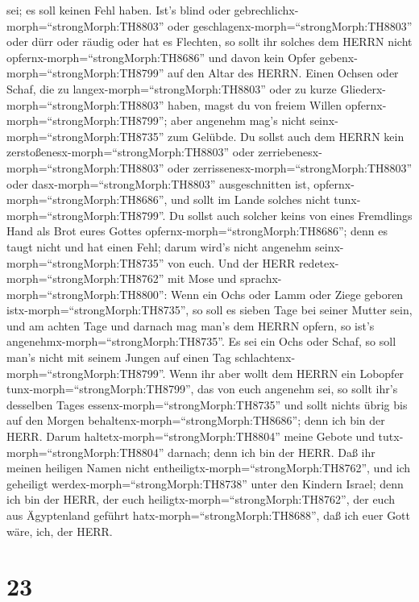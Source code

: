 sei; es soll keinen Fehl haben.  Ist's blind oder
gebrechlichx-morph=``strongMorph:TH8803'' oder
geschlagenx-morph=``strongMorph:TH8803'' oder dürr oder räudig oder hat
es Flechten, so sollt ihr solches dem HERRN nicht
opfernx-morph=``strongMorph:TH8686'' und davon kein Opfer
gebenx-morph=``strongMorph:TH8799'' auf den Altar des HERRN.
 Einen Ochsen oder Schaf, die zu
langex-morph=``strongMorph:TH8803'' oder zu kurze
Gliederx-morph=``strongMorph:TH8803'' haben, magst du von freiem Willen
opfernx-morph=``strongMorph:TH8799''; aber angenehm mag's nicht
seinx-morph=``strongMorph:TH8735'' zum Gelübde.  Du sollst
auch dem HERRN kein zerstoßenesx-morph=``strongMorph:TH8803'' oder
zerriebenesx-morph=``strongMorph:TH8803'' oder
zerrissenesx-morph=``strongMorph:TH8803'' oder
dasx-morph=``strongMorph:TH8803'' ausgeschnitten ist,
opfernx-morph=``strongMorph:TH8686'', und sollt im Lande solches nicht
tunx-morph=``strongMorph:TH8799''.  Du sollst auch solcher
keins von eines Fremdlings Hand als Brot eures Gottes
opfernx-morph=``strongMorph:TH8686''; denn es taugt nicht und hat einen
Fehl; darum wird's nicht angenehm seinx-morph=``strongMorph:TH8735'' von
euch.  Und der HERR redetex-morph=``strongMorph:TH8762''
mit Mose und sprachx-morph=``strongMorph:TH8800'':  Wenn
ein Ochs oder Lamm oder Ziege geboren istx-morph=``strongMorph:TH8735'',
so soll es sieben Tage bei seiner Mutter sein, und am achten Tage und
darnach mag man's dem HERRN opfern, so ist's
angenehmx-morph=``strongMorph:TH8735''.  Es sei ein Ochs
oder Schaf, so soll man's nicht mit seinem Jungen auf einen Tag
schlachtenx-morph=``strongMorph:TH8799''.  Wenn ihr aber
wollt dem HERRN ein Lobopfer tunx-morph=``strongMorph:TH8799'', das von
euch angenehm sei,  so sollt ihr's desselben Tages
essenx-morph=``strongMorph:TH8735'' und sollt nichts übrig bis auf den
Morgen behaltenx-morph=``strongMorph:TH8686''; denn ich bin der HERR.
 Darum haltetx-morph=``strongMorph:TH8804'' meine Gebote
und tutx-morph=``strongMorph:TH8804'' darnach; denn ich bin der HERR.
 Daß ihr meinen heiligen Namen nicht
entheiligtx-morph=``strongMorph:TH8762'', und ich geheiligt
werdex-morph=``strongMorph:TH8738'' unter den Kindern Israel; denn ich
bin der HERR, der euch heiligtx-morph=``strongMorph:TH8762'',
 der euch aus Ägyptenland geführt
hatx-morph=``strongMorph:TH8688'', daß ich euer Gott wäre, ich, der
HERR.

\hypertarget{section-22}{%
\section{23}\label{section-22}}


